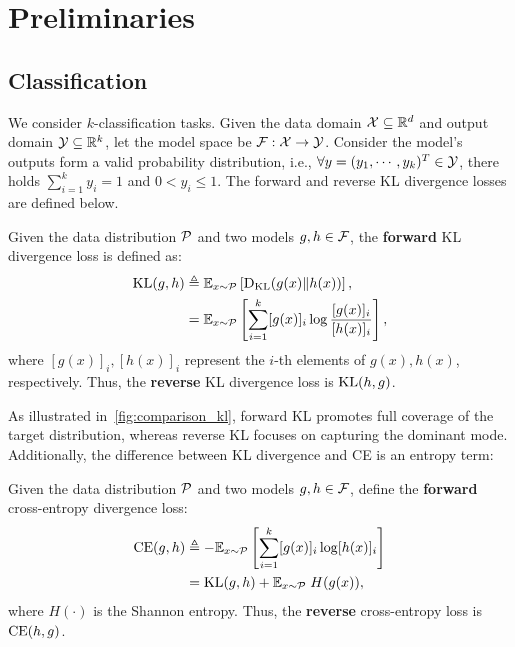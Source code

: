\section{Preliminaries}

\subsection{Classification}
We consider $k$-classification tasks.
Given the data domain $\mathcal{X} \subseteq \mathbb{R}^d$ and output domain $\mathcal{Y} \subseteq \mathbb{R}^k$, let the model space be $\mathcal{F}: \mathcal{X} \to \mathcal{Y}$. 
Consider the model's outputs form a valid probability distribution, i.e., $\forall y = (y_1, \cdots, y_k)^T \in \mathcal{Y}$, there holds $\sum_{i=1}^k y_i=1$ and $0 < y_i \le 1$.
The forward and reverse KL divergence losses are defined below.
\begin{definition}
Given the data distribution $\mathcal{P}$ and two models $g,h \in \mathcal{F}$, the \textbf{forward} KL divergence loss is defined as:
\begin{align*} 
\mathrm{KL}(g,h) & \triangleq \mathbb{E}_{x \sim \mathcal{P}} \left[ \mathrm{D}_{\mathrm{KL}}(g(x) \| h(x)) \right], \\ 
& = \mathbb{E}_{x \sim \mathcal{P}} \left[ \sum_{i=1}^k [g(x)]_i \log \frac{[g(x)]_i}{[h(x)]_i} \right],
\end{align*}
where $[g(x)]_i, [h(x)]_i$ represent the $i$-th elements of $g(x), h(x)$, respectively. 
Thus, the \textbf{reverse} KL divergence loss is $\mathrm{KL}(h,g)$.
\end{definition}

As illustrated in~\cref{fig:comparison_kl}, forward KL promotes full coverage of the target distribution, whereas reverse KL focuses on capturing the dominant mode.
Additionally, the difference between KL divergence and CE is an entropy term:
\begin{definition}
Given the data distribution $\mathcal{P}$ and two models $g,h \in \mathcal{F}$, define the \textbf{forward} cross-entropy divergence loss:
\begin{align*} 
\mathrm{CE}(g,h) & \triangleq -\mathbb{E}_{x \sim \mathcal{P}} \left[ \sum_{i=1}^k [g(x)]_i \log [h(x)]_i \right] \\ & = \mathrm{KL}(g,h) + \mathbb{E}_{x \sim \mathcal{P}} \; H(g(x)),
\end{align*}
where $H(\cdot)$ is the Shannon entropy.
Thus, the \textbf{reverse} cross-entropy loss is $\mathrm{CE}(h,g)$.
\end{definition}

